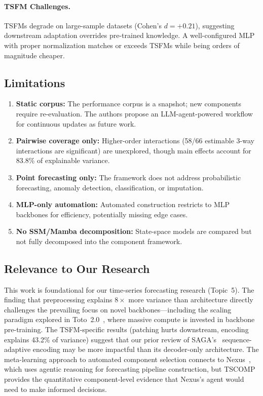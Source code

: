 \documentclass[11pt,a4paper]{article}
\begin{document}
\paragraph{TSFM Challenges.} TSFMs degrade on large-sample datasets (Cohen's $d = +0.21$), suggesting downstream adaptation overrides pre-trained knowledge. A well-configured MLP with proper normalization matches or exceeds TSFMs while being orders of magnitude cheaper.

\subsection{Limitations}

\begin{enumerate}
\item \textbf{Static corpus:} The performance corpus is a snapshot; new components require re-evaluation. The authors propose an LLM-agent-powered workflow for continuous updates as future work.
\item \textbf{Pairwise coverage only:} Higher-order interactions (58/66 estimable 3-way interactions are significant) are unexplored, though main effects account for 83.8\% of explainable variance.
\item \textbf{Point forecasting only:} The framework does not address probabilistic forecasting, anomaly detection, classification, or imputation.
\item \textbf{MLP-only automation:} Automated construction restricts to MLP backbones for efficiency, potentially missing edge cases.
\item \textbf{No SSM/Mamba decomposition:} State-space models are compared but not fully decomposed into the component framework.
\end{enumerate}

\subsection{Relevance to Our Research}

This work is foundational for our time-series forecasting research (Topic~5). The finding that preprocessing explains $8\times$ more variance than architecture directly challenges the prevailing focus on novel backbones---including the scaling paradigm explored in Toto~2.0~\cite{toto2026}, where massive compute is invested in backbone pre-training. The TSFM-specific results (patching hurts downstream, encoding explains 43.2\% of variance) suggest that our prior review of SAGA's~\cite{saga2026} sequence-adaptive encoding may be more impactful than its decoder-only architecture. The meta-learning approach to automated component selection connects to Nexus~\cite{nexus2026}, which uses agentic reasoning for forecasting pipeline construction, but TSCOMP provides the quantitative component-level evidence that Nexus's agent would need to make informed decisions.
\end{document}
